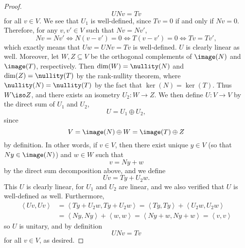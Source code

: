 \documentclass[linearalgebra]{subfiles}
\begin{document}
\begin{proof}
        \begin{equation*}
            UNv = Tv
        \end{equation*}
        for all $v\in V$. We see that $U_1$ is well-defined, since $Tv=0$ if and only if $Nv = 0$. Therefore, for any $v,v'\in V$ such that $Nv = Nv'$,
        \begin{equation*}
            Nv = Nv' \iff N\left( v-v' \right) = 0 \iff T\left(  v-v' \right) = 0 \iff Tv = Tv',
        \end{equation*}
        which exactly means that $Uw = UNv = Tv$ is well-defined. $U$ is clearly linear as well. Moreover, let $W, Z\subseteq V$ be the orthogonal complements of $\image(N)$ and $\image(T)$, respectively. Then $\dim(W) = \nullity(N)$ and $\dim(Z) = \nullity(T)$ by the rank-nullity theorem, where $\nullity(N)=\nullity(T)$ by the fact that $\ker(N)=\ker(T)$. Thus $W\iso Z$, and there exists an isometry $U_2:W\to Z$. We then define $U:V\to V$ by the direct sum of $U_1$ and $U_2$,
        \begin{equation*}
            U = U_1\oplus U_2,
        \end{equation*}
        since
        \begin{equation*}
            V = \image(N)\oplus W = \image(T)\oplus Z
        \end{equation*}
        by definition. In other words, if $v\in V$, then there exist unique $y\in V$ (so that $Ny\in \image(N)$) and $w\in W$ such that
        \begin{equation*}
            v = Ny + w
        \end{equation*}
        by the direct sum decomposition above, and we define
        \begin{equation*}
            Uv = Ty + U_2w.
        \end{equation*}
        This $U$ is clearly linear, for $U_1$ and $U_2$ are linear, and we also verified that $U$ is well-defined as well. Furthermore,
        \begin{align*}
            \left\langle Uv, Uv\right\rangle & = \left\langle Ty+U_2w, Ty+U_2w\right\rangle = \left\langle Ty, Ty\right\rangle + \left\langle U_2w, U_2w\right\rangle \\
                                             & = \left\langle Ny, Ny\right\rangle + \left\langle w, w\right\rangle = \left\langle Ny+w, Ny+w\right\rangle = \left\langle v, v\right\rangle 
        \end{align*} 
        so $U$ is unitary, and by definition
        \begin{equation*}
            UNv = Tv
        \end{equation*}
        for all $v\in V$, as desired.
    \end{proof}
\end{document}
